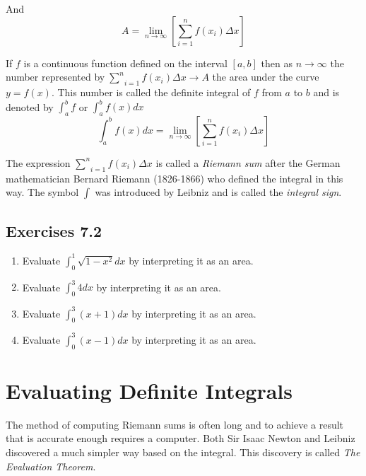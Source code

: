 And
\begin{equation*}A =\underset{n \rightarrow \infty }{\lim }\left [\underset{i =1}{\sum ^{n}} f (x_{i})  \Delta x\right ]
\end{equation*}

If $f$ is a continuous function defined on the interval $\left [a ,b\right ]$ then as $n \rightarrow \infty $ the number represented by$\;\underset{i =1}{\sum ^{n}} f (x_{i})  \Delta x \rightarrow A$ the area under the curve $y =f (x)$. This number is called the definite integral of $f$ from $a$ to $b$ and is denoted by $\int _{a}^{b}f$ or $\int _{a}^{b}f (x) d x$
\begin{equation*}\int _{a}^{b}f (x) d x =\underset{n \rightarrow \infty }{\lim }\left [\underset{i =1}{\sum ^{n}} f (x_{i})  \Delta x\right ]
\end{equation*}

The expression $\underset{i =1}{\sum ^{n}} f (x_{i})  \Delta x$ is called a \emph{Riemann sum} after the German mathematician Bernard Riemann (1826-1866) who defined the integral
in this way. The symbol $\int $ was introduced by Leibniz and is called the \emph{integral sign}. 

\subsection{Exercises 7.2}
\begin{enumerate}
\item Evaluate $\int _{0}^{1}\sqrt{1 -x^{2}} d x$ by interpreting it as an area. 

\item Evaluate $\int _{0}^{3}4 d x$ by interpreting it as an area. 

\item Evaluate $\int _{0}^{3}\left (x +1\right ) d x$ by interpreting it as an area. 

\item Evaluate $\int _{0}^{3}\left (x -1\right ) d x$ by interpreting it as an area. \end{enumerate}


\section{Evaluating Definite Integrals}
The method of computing Riemann sums is often long and to achieve a result that is accurate enough requires a computer. Both Sir Isaac Newton
and Leibniz discovered a much simpler way based on the integral. This discovery is called \emph{The
Evaluation Theorem}. 

